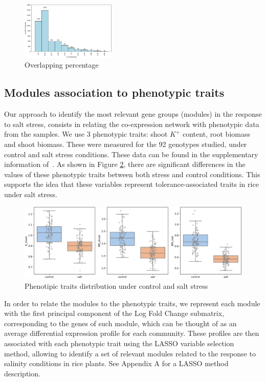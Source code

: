 \documentclass[journal, onecolumn]{IEEEtran}
\begin{document}
\begin{figure}[h]
  \centering
    \includegraphics[clip,width=0.4\textwidth]{Figures/artificial_modules.png}
  \caption{Overlapping percentage}
  \label{fig:overlap}
\end{figure}

\subsection{Modules association to phenotypic traits}

Our approach to identify the most relevant gene groups (modules) in the response to salt stress, consists in relating the co-expression network with phenotypic data from the samples. We use 3 phenotypic traits: shoot $K^+$ content, root biomass and shoot biomass. These were measured for the 92 genotypes studied, under  control and salt stress conditions. These data can be found in the supplementary information of~\cite{campbell2017allelic}. As shown in Figure \ref{fig:pdata}, there are significant differences in the values of these phenotypic traits between both stress and control conditions. This supports the idea that these variables represent tolerance-associated traits in rice under salt stress.\\

\begin{figure}[h]
  \centering
    \includegraphics[clip,width=1\textwidth]{Figures/phenotypic_traits.png}
  \caption{Phenotipic traits distribution under control and salt stress}
  \label{fig:pdata}
\end{figure}

In order to relate the modules to the phenotypic traits, we represent each module with the first principal component of the Log Fold Change submatrix, corresponding to the genes of such module, which can be thought of as an average differential expression profile for each community. These profiles are then associated with each phenotypic trait using the LASSO variable selection method, allowing to identify a set of relevant modules related to the response to salinity conditions in rice plants. See Appendix A for a LASSO method description.\\
\end{document}
